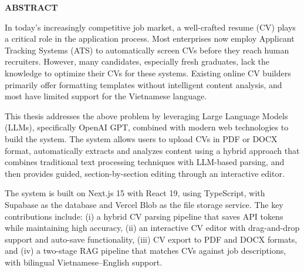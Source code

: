 \documentclass[../DoAn.tex]{subfiles}
\begin{document}
\begin{center}
    \Large{\textbf{ABSTRACT}}\\
\end{center}
\vspace{1cm}
In today's increasingly competitive job market, a well-crafted resume (CV) plays a critical role in the application process. Most enterprises now employ Applicant Tracking Systems (ATS) to automatically screen CVs before they reach human recruiters. However, many candidates, especially fresh graduates, lack the knowledge to optimize their CVs for these systems. Existing online CV builders primarily offer formatting templates without intelligent content analysis, and most have limited support for the Vietnamese language.

This thesis addresses the above problem by leveraging Large Language Models (LLMs), specifically OpenAI GPT, combined with modern web technologies to build the system. The system allows users to upload CVs in PDF or DOCX format, automatically extracts and analyzes content using a hybrid approach that combines traditional text processing techniques with LLM-based parsing, and then provides guided, section-by-section editing through an interactive editor.

The system is built on Next.js 15 with React 19, using TypeScript, with Supabase as the database and Vercel Blob as the file storage service. The key contributions include: (i) a hybrid CV parsing pipeline that saves API tokens while maintaining high accuracy, (ii) an interactive CV editor with drag-and-drop support and auto-save functionality, (iii) CV export to PDF and DOCX formats, and (iv) a two-stage RAG pipeline that matches CVs against job descriptions, with bilingual Vietnamese--English support.
\end{document}
